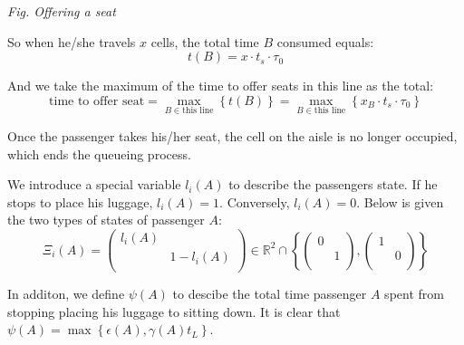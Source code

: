 \documentclass{article}
\begin{document}
\begin{itemize}
\begin{center}
		\small\textit{Fig. Offering a seat}
		\end{center}

		So when he/she travels $x$ cells, the total time \(B\) consumed equals:
		$$t(B)=x\cdot t_s \cdot \tau_0$$

		And we take the maximum of the time to offer seats in this line as the total:
		\[\text{time to offer seat}=\max\limits_{B\in \text{this line}}\left\{t(B)\right\} = \max\limits_{B\in \text{this line}}\left\{x_{B}\cdot t_s \cdot \tau_0\right\}\]

		Once the passenger takes his/her seat, the cell on the aisle is no longer occupied, which ends the queueing process.
	\end{itemize}
	We introduce a special variable $l_i(A)$ to describe the passengers state. If he stops to place his luggage, \(l_i(A)=1\). Conversely, \(l_i(A)=0\). Below is given the two types of states of passenger \(A\):
	\[\Xi_i\left(A\right)=\left( \begin{matrix}
	l_i\left( A \right)&		\\
	&		1-l_i\left( A \right)\\
	\end{matrix} \right) \in \mathbb{R}^2\cap \left\{ \left( \begin{matrix}
	0&		\\
	&		1\\
	\end{matrix} \right) ,\left( \begin{matrix}
	1&		\\
	&		0\\
	\end{matrix} \right) \right\}\]

	In additon, we define $\psi(A)$ to descibe the total time passenger $A$ spent from stopping placing his luggage to sitting down. It is clear that $\psi \left( A \right) =\max \left\{ \epsilon \left( A \right) ,\gamma \left( A \right) t_L \right\}$.
\end{document}
